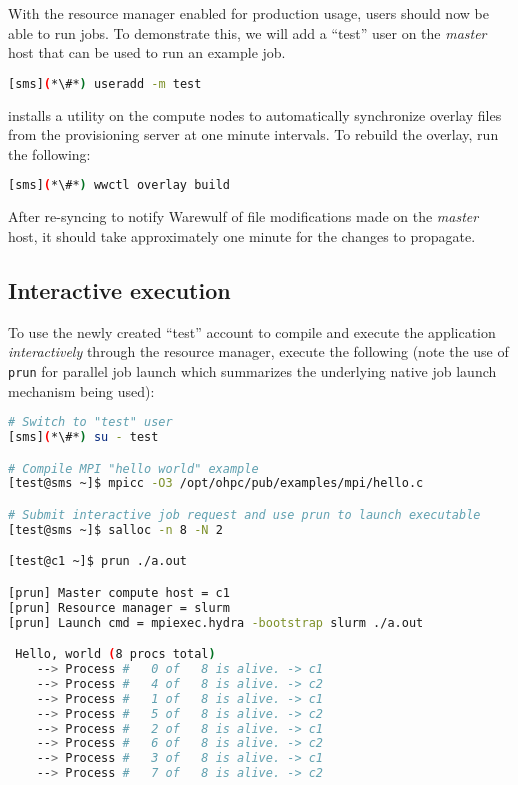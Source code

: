 With the resource manager enabled for production usage, users should now be
able to run jobs. To demonstrate this, we will add a ``test'' user on the {\em master}
host that can be used to run an example job.

\begin{lstlisting}[language=bash,keywords={}]
[sms](*\#*) useradd -m test
\end{lstlisting}

\Warewulf{} installs a utility on the compute nodes to automatically
synchronize overlay files from the provisioning server at one minute intervals. 
To rebuild the overlay, run the following:

\begin{lstlisting}[language=bash,keywords={}]
[sms](*\#*) wwctl overlay build
\end{lstlisting}


After re-syncing to notify Warewulf of file modifications made on the {\em
master} host, it should take approximately one minute for the changes to
propagate.





\subsection{Interactive execution}
To use the newly created ``test'' account to compile and execute the
application {\em interactively} through the resource manager, execute the
following (note the use of \texttt{prun} for parallel job launch which summarizes
the underlying native job launch mechanism being used):

\begin{lstlisting}[language=bash,keywords={}]
# Switch to "test" user
[sms](*\#*) su - test

# Compile MPI "hello world" example
[test@sms ~]$ mpicc -O3 /opt/ohpc/pub/examples/mpi/hello.c

# Submit interactive job request and use prun to launch executable
[test@sms ~]$ salloc -n 8 -N 2

[test@c1 ~]$ prun ./a.out

[prun] Master compute host = c1
[prun] Resource manager = slurm
[prun] Launch cmd = mpiexec.hydra -bootstrap slurm ./a.out

 Hello, world (8 procs total)
    --> Process #   0 of   8 is alive. -> c1
    --> Process #   4 of   8 is alive. -> c2
    --> Process #   1 of   8 is alive. -> c1
    --> Process #   5 of   8 is alive. -> c2
    --> Process #   2 of   8 is alive. -> c1
    --> Process #   6 of   8 is alive. -> c2
    --> Process #   3 of   8 is alive. -> c1
    --> Process #   7 of   8 is alive. -> c2
\end{lstlisting}

